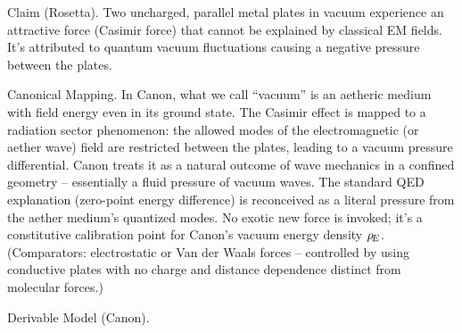 \documentclass[11pt]{article}
\begin{document}
Claim (Rosetta). Two uncharged, parallel metal plates in vacuum experience an attractive force (Casimir force) that cannot be explained by classical EM fields. It’s attributed to quantum vacuum fluctuations causing a negative pressure between the plates.


Canonical Mapping. In Canon, what we call “vacuum” is an aetheric medium with field energy even in its ground state. The Casimir effect is mapped to a radiation sector phenomenon: the allowed modes of the electromagnetic (or aether wave) field are restricted between the plates, leading to a vacuum pressure differential. Canon treats it as a natural outcome of wave mechanics in a confined geometry – essentially a fluid pressure of vacuum waves. The standard QED explanation (zero-point energy difference) is reconceived as a literal pressure from the aether medium’s quantized modes. No exotic new force is invoked; it’s a constitutive calibration point for Canon’s vacuum energy density $\rho_{\!E}$. (Comparators: electrostatic or Van der Waals forces – controlled by using conductive plates with no charge and distance dependence distinct from molecular forces.)


Derivable Model (Canon).
\end{document}

